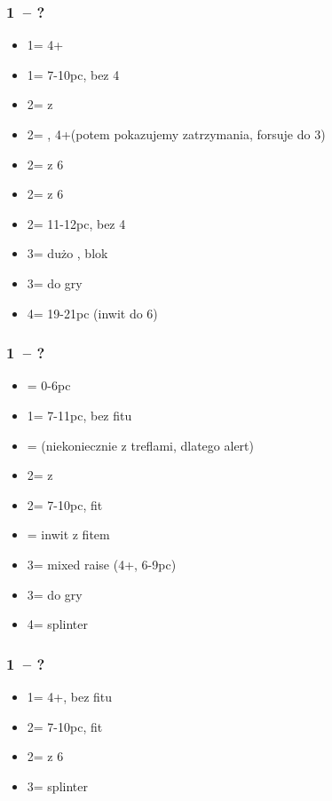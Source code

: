 \documentclass[12pt, a4paper]{article}
\begin{document}
\subsubsection*{1\diams\ -- ?}
\begin{itemize}
    \item 1\major = 4+\major
    \item 1\nt = 7-10pc, bez 4\major
    \item 2\clubs = \gf z \clubs
    \item 2\diams = \invp, 4+\diams (potem pokazujemy zatrzymania, forsuje do 3\diams)
    \item 2\hearts = \gf z 6\hearts
    \item 2\spades = \gf z 6\spades
    \item 2\nt = 11-12pc, bez 4\major
    \item 3\diams = dużo \diams, blok
    \item 3\nt = do gry
    \item 4\nt = 19-21pc (inwit do 6\nt)
\end{itemize}

\subsubsection*{1\major\ -- ?}
\begin{itemize}
    \item \pass = 0-6pc
    \item 1\nt = 7-11pc, bez fitu
    \item \alrts{2\clubs} = \gf (niekoniecznie z treflami, dlatego alert)
    \item 2\diams = \gf z \diams
    \item 2\major = 7-10pc, fit
    \item \alrts{2\nt} = inwit z fitem
    \item 3\major = mixed raise (4+\major, 6-9pc)
    \item 3\nt = do gry
    \item 4\minor = splinter
\end{itemize}

\subsubsection*{1\hearts\ -- ?}
\begin{itemize}
    \item 1\spades = 4+\spades, bez fitu
    \item 2\hearts = 7-10pc, fit
    \item 2\spades = \gf z 6\spades
    \item 3\spades = splinter
\end{itemize}
\end{document}
